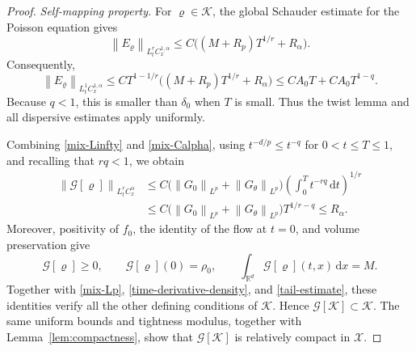 \documentclass[11pt]{article}
\newcommand{\R}{\mathbb R}
\newcommand{\norm}[1]{\left\lVert #1\right\rVert}
\newcommand{\dd}{\,\mathrm d}
\begin{document}
\begin{proof}
\emph{Self-mapping property.}
For $\varrho\in\mathcal K$, the global Schauder estimate for the Poisson
equation gives
\begin{equation}\label{E-varrho-bound}
 \norm{E_\varrho}_{L^r_tC^{1,\alpha}_x}
 \leq C\big((M+R_p)T^{1/r}+R_\alpha\big).
\end{equation}
Consequently,
\begin{equation*}
 \norm{E_\varrho}_{L^1_tC^{1,\alpha}_x}
 \leq CT^{1-1/r}\big((M+R_p)T^{1/r}+R_\alpha\big)
 \leq C A_0T+C A_0T^{1-q}.
\end{equation*}
Because $q<1$, this is smaller than $\delta_0$ when $T$ is small.  Thus
the twist lemma and all dispersive estimates apply uniformly.

Combining \eqref{mix-Linfty} and
\eqref{mix-Calpha}, using $t^{-d/p}\leq t^{-q}$ for
$0<t\leq T\leq1$, and recalling that $rq<1$, we obtain
\begin{align}
 \norm{\mathcal G[\varrho]}_{L^r_tC^\alpha_x}
 &\leq
 C\big(\norm{G_0}_{L^p}+\norm{G_\theta}_{L^p}\big)
 \left(\int_0^Tt^{-rq}\dd t\right)^{1/r}\nonumber\\
 &\leq
 C\big(\norm{G_0}_{L^p}+\norm{G_\theta}_{L^p}\big)T^{1/r-q}
 \leq R_\alpha.\label{selfmap-holder}
\end{align}
Moreover, positivity of $f_0$, the identity of the flow at $t=0$,
and volume preservation give
\begin{equation*}
 \mathcal G[\varrho]\geq0,\qquad
 \mathcal G[\varrho](0)=\rho_0,\qquad
 \int_{\R^d}\mathcal G[\varrho](t,x)\dd x=M.
\end{equation*}
Together with \eqref{mix-Lp},
\eqref{time-derivative-density}, and \eqref{tail-estimate}, these identities
verify all the other defining conditions of $\mathcal K$.  Hence
$\mathcal G[\mathcal K]\subset\mathcal K$.
The same uniform bounds and tightness modulus, together
with Lemma~\ref{lem:compactness}, show that
$\mathcal G[\mathcal K]$ is relatively compact in $\mathcal X$.


\end{proof}
\end{document}
